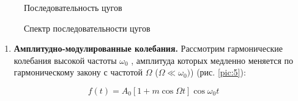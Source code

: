 \documentclass[a4paper,12pt]{article}
\begin{document}
\begin{figure}[h]
    \begin{minipage}[h]{0.5\linewidth}
        \caption{Последовательность цугов}
        \label{pic:3}
    \end{minipage}
    \begin{minipage}[h]{0.5\linewidth}
        \caption{Спектр последовательности цугов}
        \label{pic:4}
    \end{minipage}
\end{figure}

\begin{enumerate}[resume]
    \item \textbf{Амплитудно-модулированные колебания.} Рассмотрим гармонические колебания высокой частоты $\omega_{0}$ , амплитуда которых медленно меняется по гармоническому закону с частотой $\Omega$ ($\Omega \ll \omega_{0})$) (рис. \ref{pic:5}):
\end{enumerate}


\begin{equation}\label{eq:7}
    f(t)=A_{0}[1+m\cos\Omega t]\cos \omega_{0}t
\end{equation}
\end{document}
